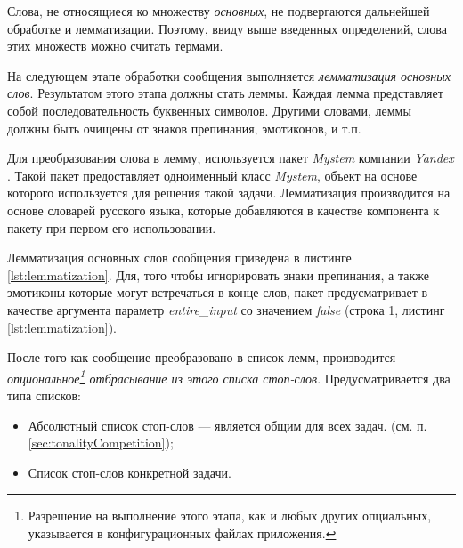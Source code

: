     \lstset{style=python}
    

    Слова, не относящиеся ко множеству {\it основных}, не подвергаются дальнейшей
    обработке и лемматизации.
    Поэтому, ввиду выше введенных определений, слова этих множеств можно считать
    термами.

    На следующем этапе обработки сообщения выполняется {\it лемматизация основных слов}.
    Результатом этого этапа должны стать леммы.
    Каждая лемма представляет собой последовательность буквенных символов.
    Другими словами, леммы должны быть очищены от знаков препинания, эмотиконов,
    и т.п.

    Для преобразования слова в лемму, используется пакет {\it Mystem} компании
    {\it Yandex} \cite{mystem}.
    Такой пакет предоставляет одноименный класс {\it Mystem}, объект на основе
    которого используется для решения такой задачи.
    Лемматизация производится на основе словарей русского языка, которые
    добавляются в качестве компонента к пакету при первом его использовании.

    Лемматизация основных слов сообщения приведена в листинге \ref{lst:lemmatization}.
    Для, того чтобы игнорировать знаки препинания, а также эмотиконы которые
    могут встречаться в конце слов, пакет предусматривает в качестве аргумента
    параметр {\it entire\_input} со значением {\it false} (строка 1, листинг
    \ref{lst:lemmatization}).

    \lstset{style=python}
    

    После того как сообщение преобразовано в список лемм, производится
    {\it опциональное\footnote{
            Разрешение на выполнение этого этапа, как и любых других опциальных,
            указывается в конфигурационных файлах приложения.
        }
    отбрасывание из этого списка стоп-слов}.
    Предусматривается два типа списков:
    \begin{itemize}
        \item Абсолютный список стоп-слов --- является общим для всех задач.
            (см. п. \ref{sec:tonalityCompetition});
        \item Список стоп-слов конкретной задачи.
    \end{itemize}

